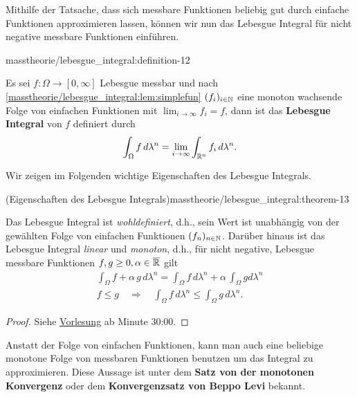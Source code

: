 \par
Mithilfe der Tatsache, dass sich messbare Funktionen beliebig gut durch einfache Funktionen approximieren lassen, können wir nun das Lebesgue Integral für nicht negative messbare Funktionen einführen.
\begin{definition}{}{masstheorie/lebesgue_integral:definition-12}



\par
Es sei \(f:\Omega\to[0,\infty]\) Lebesgue messbar und nach \cref{masstheorie/lebesgue_integral:lem:simplefun} \((f_i)_{i\in\mathbb{N}}\) eine monoton wachsende Folge von einfachen Funktionen mit \(\lim_{i\to\infty} f_i = f\), dann ist das \textbf{Lebesgue Integral} von \(f\) definiert durch
\begin{align*}
\int_{\Omega} f \,d\lambda^n = \lim_{i\rightarrow \infty} \int_{\mathbb{R}^n} f_i \,d\lambda^n.
\end{align*}\end{definition}

\par
Wir zeigen im Folgenden wichtige Eigenschaften des Lebesgue Integrals.
\begin{theorem}{(Eigenschaften des Lebesgue Integrals)}{masstheorie/lebesgue_integral:theorem-13}



\par
Das Lebesgue Integral ist \emph{wohldefiniert}, d.h., sein Wert ist unabhängig von der gewählten Folge von einfachen Funktionen \((f_n)_{n\in\mathbb{N}}\).
Darüber hinaus ist das Lebesgue Integral \emph{linear} und \emph{monoton}, d.h., für nicht negative, Lebesgue messbare Funktionen \(f,g \geq 0,\alpha\in\overline{\mathbb{R}}\) gilt
\begin{align*}
\int_\Omega f+\alpha\,g\,d\lambda^n = \int_\Omega f\,d\lambda^n + \alpha\, \int_\Omega g d\lambda^n\\
f \leq g \quad \Rightarrow \quad \int_\Omega f\, d\lambda^n \leq \int_\Omega g\, d\lambda^n.
\end{align*}\end{theorem}

\begin{proof}
 Siehe \href{https://www.fau.tv/clip/id/40589}{Vorlesung} ab Minute 30:00.
\end{proof}

\par
Anstatt der Folge von einfachen Funktionen, kann man auch eine beliebige monotone Folge von messbaren Funktionen benutzen um das Integral zu approximieren. Diese Aussage ist unter dem \textbf{Satz von der monotonen Konvergenz} oder dem \textbf{Konvergenzsatz von Beppo Levi} bekannt.

